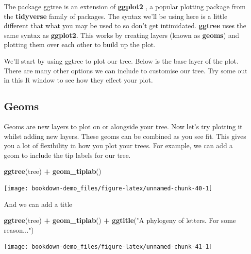 \documentclass[
]{book}
\newenvironment{Shaded}{\begin{snugshade}}{\end{snugshade}}
\newcommand{\KeywordTok}[1]{\textcolor[rgb]{0.13,0.29,0.53}{\textbf{#1}}}
\newcommand{\NormalTok}[1]{#1}
\newcommand{\OperatorTok}[1]{\textcolor[rgb]{0.81,0.36,0.00}{\textbf{#1}}}
\newcommand{\StringTok}[1]{\textcolor[rgb]{0.31,0.60,0.02}{#1}}
\begin{document}
The package ggtree is an extension of \textbf{ggplot2} \citep{ggplot2}, a popular plotting package from the \textbf{tidyverse} family of packages. The syntax we'll be using here is a little different that what you may be used to so don't get intimidated. \textbf{ggtree} uses the same syntax as \textbf{ggplot2}. This works by creating layers (known as \textbf{geoms}) and plotting them over each other to build up the plot.

We'll start by using ggtree to plot our tree. Below is the base layer of the plot. There are many other options we can include to customise our tree. Try some out in this R window to see how they effect your plot.

\hypertarget{geoms}{%
\subsection{Geoms}\label{geoms}}

Geoms are new layers to plot on or alongside your tree. Now let's try plotting it whilst adding new layers. These geoms can be combined as you see fit. This gives you a lot of flexibility in how you plot your trees. For example, we can add a geom to include the tip labels for our tree.

\begin{Shaded}
\begin{Highlighting}[]
\KeywordTok{ggtree}\NormalTok{(tree) }\OperatorTok{+}\StringTok{ }
\StringTok{  }\KeywordTok{geom\_tiplab}\NormalTok{()}
\end{Highlighting}
\end{Shaded}

\begin{center}\texttt{[image: bookdown-demo\_files/figure-latex/unnamed-chunk-40-1]} \end{center}

And we can add a title

\begin{Shaded}
\begin{Highlighting}[]
\KeywordTok{ggtree}\NormalTok{(tree) }\OperatorTok{+}\StringTok{ }
\StringTok{  }\KeywordTok{geom\_tiplab}\NormalTok{() }\OperatorTok{+}
\StringTok{  }\KeywordTok{ggtitle}\NormalTok{(}\StringTok{"A phylogeny of letters. For some reason..."}\NormalTok{)}
\end{Highlighting}
\end{Shaded}

\begin{center}\texttt{[image: bookdown-demo\_files/figure-latex/unnamed-chunk-41-1]} \end{center}
\end{document}
